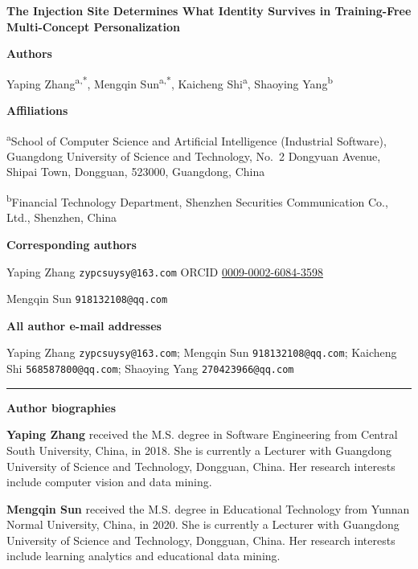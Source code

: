 \documentclass[10pt,a4paper]{article}
\begin{document}
{\fontsize{14}{17}\selectfont\bfseries The Injection Site Determines What
Identity Survives in Training-Free Multi-Concept Personalization\par}

\vspace{8pt}

\fontsize{8}{10.5}\selectfont

\textbf{Authors}

Yaping Zhang\textsuperscript{a,*}, Mengqin Sun\textsuperscript{a,*},
Kaicheng Shi\textsuperscript{a}, Shaoying Yang\textsuperscript{b}

\textbf{Affiliations}

\textsuperscript{a}School of Computer Science and Artificial Intelligence
(Industrial Software), Guangdong University of Science and Technology,
No.~2 Dongyuan Avenue, Shipai Town, Dongguan, 523000, Guangdong, China

\textsuperscript{b}Financial Technology Department, Shenzhen Securities
Communication Co., Ltd., Shenzhen, China

\textbf{Corresponding authors}

Yaping Zhang \quad \texttt{zypcsuysy@163.com} \quad
ORCID \href{https://orcid.org/0009-0002-6084-3598}{0009-0002-6084-3598}

Mengqin Sun \quad \texttt{918132108@qq.com}

\textbf{All author e-mail addresses}

Yaping Zhang \texttt{zypcsuysy@163.com};
Mengqin Sun \texttt{918132108@qq.com};
Kaicheng Shi \texttt{568587800@qq.com};
Shaoying Yang \texttt{270423966@qq.com}

\vspace{4pt}
\hrule
\vspace{4pt}

\textbf{Author biographies}

\textbf{Yaping Zhang} received the M.S. degree in Software Engineering from
Central South University, China, in 2018.  She is currently a Lecturer with
Guangdong University of Science and Technology, Dongguan, China.  Her research
interests include computer vision and data mining.

\textbf{Mengqin Sun} received the M.S. degree in Educational Technology from
Yunnan Normal University, China, in 2020.  She is currently a Lecturer with
Guangdong University of Science and Technology, Dongguan, China.  Her research
interests include learning analytics and educational data mining.
\end{document}
